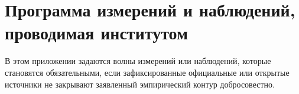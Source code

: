 \section{Программа измерений и наблюдений, проводимая институтом}

В этом приложении задаются волны измерений или наблюдений, которые становятся обязательными, если зафиксированные официальные или открытые источники не закрывают заявленный эмпирический контур добросовестно.

